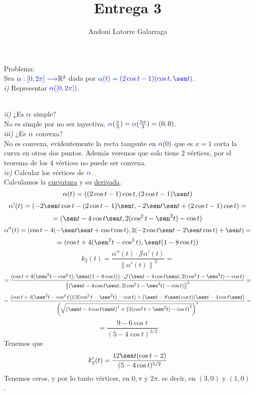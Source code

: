\documentclass{article}
\title{Entrega 3}
\author{Andoni Latorre Galarraga}
\date{}
\newcommand{\bb}[1]{\mathbb{#1}}
\begin{document}
\maketitle

\textcolor{WildStrawberry}{Problema:}\\
Sea $\textcolor{blue}{\alpha:[0,2\pi] \longrightarrow} \bb{R}^2$ dada por $\textcolor{blue}{\alpha(t)= (2\cos t -1)(\cos t, \sen t)}$.\\
\textit{i)} Representar $\textcolor{blue}{\alpha([0, 2\pi])}$.\\
\\
\textit{ii)} ¿Es $\textcolor{blue}{\alpha}$ simple?\\
No es simple por no ser inyectiva. $\textcolor{blue}{\alpha}(\frac{\pi}{3})=\textcolor{blue}{\alpha}(\frac{5\pi}{3})=(0,0)$.\\
\textit{iii)} ¿Es $\textcolor{blue}{\alpha}$ convexa?\\
No es convexa, evidentemente la recta tangente en $\textcolor{blue}{\alpha}(0)$ que es $x= 1$ corta la curva en otros dos puntos. Además veremos que solo tiene 2 vértices, por el teorema de los 4 vértices no puede ser convexa.\\
\textit{iv)} Calcular los vértices de $\textcolor{blue}{\alpha}$.\\
Calculamos la \href{https://www.wolframalpha.com/input?i=Curvature+of+%28%282cos%28t%29-1%29*cos%28t%29%2C%282cos%28t%29-1%29*sin%28t%29%29}{\textcolor{WildStrawberry}{\underline{curvatura}}} y su \href{https://www.wolframalpha.com/input?i=derivative+%289+-+6+cos%28t%29%29%2F%285+-+4+cos%28t%29%29%5E%283%2F2%29}{\textcolor{WildStrawberry}{\underline{derivada}}}.
$$
\alpha(t) = ((2\cos t -1)\cos t, (2\cos t -1) \sen t)
$$
$$
\alpha'(t) = (-2\sen t \cos t - (2\cos t -1)\sen t, -2\sen t \sen t + (2\cos t -1)\cos t) =
$$
$$
= (\sen t - 4 \cos t \sen t, 2(\cos^2 t -\sen^2 t)-\cos t)
$$
$$
\alpha''(t) = (\cos t - 4 (-\sen t \sen t + \cos t \cos t), 2(-2\cos t \sen t - 2 \sen t \cos t) + \sen t)=
$$
$$
= (\cos t + 4(\sen^2 t - \cos^2 t), \sen t(1 - 8 \cos t))
$$
$$
k_2(t) = \frac{\alpha''(t) \cdot \mathcal{J}\alpha'(t)}{\left\| \alpha'(t) \right\|^3} =
$$
$$
= \frac{(\cos t + 4(\sen^2 t - \cos^2 t), \sen t(1 - 8 \cos t)) \cdot \mathcal{J}(\sen t - 4 \cos t \sen t, 2(\cos^2 t -\sen^2 t)-\cos t)}{\left\| (\sen t - 4 \cos t \sen t, 2(\cos^2 t -\sen^2 t)-\cos t) \right\|^3} =
$$
$$
= \frac{(\cos t + 4(\sen^2 t - \cos^2 t)) (2(\cos^2 t -\sen^2 t)-\cos t) + (\sen t - 8\sen t \cos t) (\sen t - 4 \cos t \sen t)}{\left(\sqrt{\left( \sen t - 4 \cos t \sen t \right)^2+\left( 2(\cos^2 t -\sen^2 t)-\cos t \right)^2}\right)^3} =
$$
$$
= \frac{9-6 \cos t}{(5-4\cos t)^{3/2}}
$$
Tenemos que
$$
k_2'(t)=\frac{12 \sen t(\cos t -2)}{(5- 4 \cos t)^{5/2}}
$$
Tenemos ceros, y por lo tanto vértices, en $0, \pi$ y $2\pi$, es decir, en $(3,0)$ y $(1,0)$.
\end{document}
